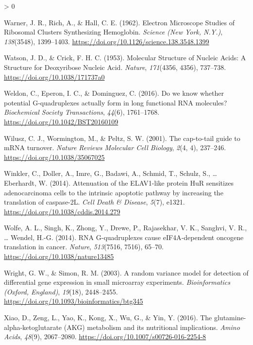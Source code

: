 \documentclass[
  12pt,
  openany]{book}
\newlength{\cslhangindent}
\newenvironment{CSLReferences}[2] %
 {%
  \setlength{\parindent}{0pt}
  \ifodd #1 \everypar{\setlength{\hangindent}{\cslhangindent}}\ignorespaces\fi
  \ifnum #2 > 0
  \setlength{\parskip}{#2\baselineskip}
  \fi
 }%
 {}
\begin{document}
\begin{CSLReferences}{1}{0}
\leavevmode\hypertarget{ref-Warner1962}{}%
Warner, J. R., Rich, A., \& Hall, C. E. (1962). Electron {Microscope Studies} of {Ribosomal Clusters Synthesizing Hemoglobin}. \emph{Science (New York, N.Y.)}, \emph{138}(3548), 1399--1403. \url{https://doi.org/10.1126/science.138.3548.1399}

\leavevmode\hypertarget{ref-Watson1953}{}%
Watson, J. D., \& Crick, F. H. C. (1953). Molecular {Structure} of {Nucleic Acids}: {A Structure} for {Deoxyribose Nucleic Acid}. \emph{Nature}, \emph{171}(4356, 4356), 737--738. \url{https://doi.org/10.1038/171737a0}

\leavevmode\hypertarget{ref-Weldon2016}{}%
Weldon, C., Eperon, I. C., \& Dominguez, C. (2016). Do we know whether potential {G}-quadruplexes actually form in long functional {RNA} molecules? \emph{Biochemical Society Transactions}, \emph{44}(6), 1761--1768. \url{https://doi.org/10.1042/BST20160109}

\leavevmode\hypertarget{ref-Wilusz2001}{}%
Wilusz, C. J., Wormington, M., \& Peltz, S. W. (2001). The cap-to-tail guide to {mRNA} turnover. \emph{Nature Reviews Molecular Cell Biology}, \emph{2}(4, 4), 237--246. \url{https://doi.org/10.1038/35067025}

\leavevmode\hypertarget{ref-Winkler2014}{}%
Winkler, C., Doller, A., Imre, G., Badawi, A., Schmid, T., Schulz, S., \ldots{} Eberhardt, W. (2014). Attenuation of the {ELAV1}-like protein {HuR} sensitizes adenocarcinoma cells to the intrinsic apoptotic pathway by increasing the translation of caspase-{2L}. \emph{Cell Death \& Disease}, \emph{5}(7), e1321. \url{https://doi.org/10.1038/cddis.2014.279}

\leavevmode\hypertarget{ref-Wolfe2014}{}%
Wolfe, A. L., Singh, K., Zhong, Y., Drewe, P., Rajasekhar, V. K., Sanghvi, V. R., \ldots{} Wendel, H.-G. (2014). {RNA G}-quadruplexes cause {eIF4A}-dependent oncogene translation in cancer. \emph{Nature}, \emph{513}(7516, 7516), 65--70. \url{https://doi.org/10.1038/nature13485}

\leavevmode\hypertarget{ref-Wright2003}{}%
Wright, G. W., \& Simon, R. M. (2003). A random variance model for detection of differential gene expression in small microarray experiments. \emph{Bioinformatics (Oxford, England)}, \emph{19}(18), 2448--2455. \url{https://doi.org/10.1093/bioinformatics/btg345}

\leavevmode\hypertarget{ref-Xiao2016}{}%
Xiao, D., Zeng, L., Yao, K., Kong, X., Wu, G., \& Yin, Y. (2016). The glutamine-alpha-ketoglutarate ({AKG}) metabolism and its nutritional implications. \emph{Amino Acids}, \emph{48}(9), 2067--2080. \url{https://doi.org/10.1007/s00726-016-2254-8}


\end{CSLReferences}
\end{document}
